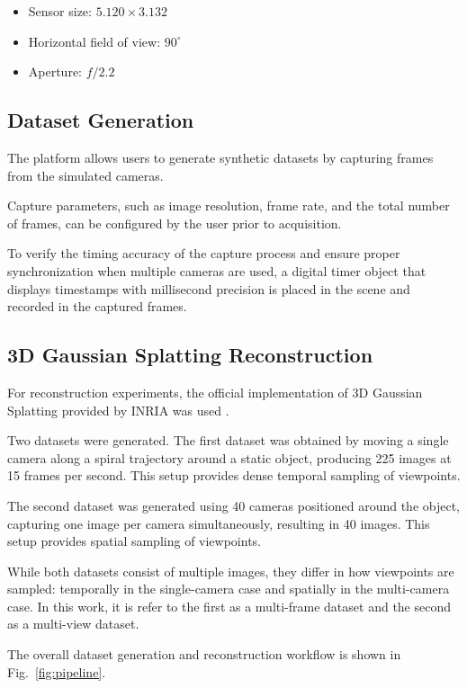 \documentclass[conference]{IEEEtran}
\begin{document}
\begin{itemize}
    \item Sensor size: $5.120 \times 3.132$
    \item Horizontal field of view: $90^\circ$
    \item Aperture: $f/2.2$
\end{itemize}


\subsection{Dataset Generation}
The platform allows users to generate synthetic datasets by capturing frames from the simulated cameras.

Capture parameters, such as image resolution, frame rate, and the total number of frames, can be configured by the user prior to acquisition. 

To verify the timing accuracy of the capture process and ensure proper synchronization when multiple cameras are used, a digital timer object that displays timestamps with millisecond precision is placed in the scene and recorded in the captured frames.

\subsection{3D Gaussian Splatting Reconstruction}

For reconstruction experiments, the official implementation of 3D Gaussian Splatting provided by INRIA was used \cite{gaussian-splatting}.

Two datasets were generated. The first dataset was obtained by moving a single camera along a spiral trajectory around a static object, producing 225 images at 15 frames per second. This setup provides dense temporal sampling of viewpoints.

The second dataset was generated using 40 cameras positioned around the object, capturing one image per camera simultaneously, resulting in 40 images. This setup provides spatial sampling of viewpoints.

While both datasets consist of multiple images, they differ in how viewpoints are sampled: temporally in the single-camera case and spatially in the multi-camera case. In this work, it is refer to the first as a multi-frame dataset and the second as a multi-view dataset. 

The overall dataset generation and reconstruction workflow is shown in Fig.~\ref{fig:pipeline}.
\end{document}
